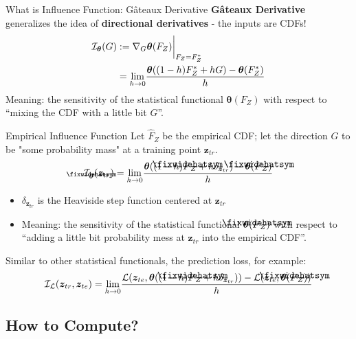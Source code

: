 \documentclass[blue]{beamer}
\newcommand\lowerwidehatsym{%
  \text{\smash{\raisebox{-1.3ex}{%
    $\fixwidehatsym$}}}}
\newcommand\fixwidehat[1]{%
  \mathchoice
    {\accentset{\displaystyle\lowerwidehatsym}{#1}}
    {\accentset{\textstyle\lowerwidehatsym}{#1}}
    {\accentset{\scriptstyle\lowerwidehatsym}{#1}}
    {\accentset{\scriptscriptstyle\lowerwidehatsym}{#1}}
}
\begin{document}
\begin{frame}{What is Influence Function: G\^ateaux Derivative}{}
  \textbf{G\^ateaux Derivative} generalizes the idea of \textbf{directional derivatives} - the inputs are CDFs!
\begin{align}\label{gateaux}
  \mathcal{I}_{\bm{\theta}}(G) &:= \nabla_{G} \bm{\theta}(F_Z)\biggr\rvert_{F_Z=F^*_Z} \notag\\
  &= \underset{h \to 0}{\lim}\frac{\bm{\theta}((1-h)F^*_Z + hG) - \bm{\theta}(F^*_Z)}{h}
\end{align}
Meaning: the sensitivity of the statistical functional $\bm{\theta}(F_Z)$ with respect to ``mixing the CDF with a little bit $G$''.
\end{frame}


\begin{frame}{Empirical Influence Function}{}
Let $\hat{F}_Z$ be the empirical CDF; let the direction $G$ to be "some probability mass" at a training point $\bm{z}_{tr}$.
\begin{align}\label{empinfluence}
  \mathcal{I}_{\fixwidehat{\bm{\theta}}}(\bm{z}_{tr}) = \underset{h \to 0}{\lim}\frac{\bm{\theta}((1-h)\fixwidehat{F}_Z+ h\delta_{\bm{z}_{tr}}) - \bm{\theta}(\fixwidehat{F}_Z)}{h}
\end{align}
\begin{itemize}
  \item $\delta_{\bm{z}_{tr}}$ is the Heaviside step function centered at $\bm{z}_{tr}$
  \item Meaning: the sensitivity of the statistical functional $\bm{\theta}(\fixwidehat{F}_Z)$ with respect to ``adding a little bit probability mess at $\bm{z}_{tr}$ into the empirical CDF''.
\end{itemize}
Similar to other statistical functionals, the prediction loss, for example:
    \begin{align}\label{lossinfluence}
  \mathcal{I}_{\mathcal{L}}(\bm{z}_{tr}, \bm{z}_{te}) = \underset{h \to 0}{\lim}\frac{\mathcal{L}(\bm{z}_{te}, \bm{\theta}((1-h)\fixwidehat{F}_Z + h\delta_{\bm{z}_{tr}})) - \mathcal{L}(\bm{z}_{te}, \bm{\theta}(\fixwidehat{F}_Z))}{h}
    \end{align}
\end{frame}




\subsection{How to Compute?}
\end{document}
